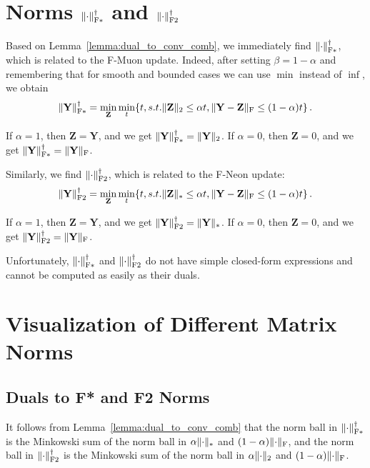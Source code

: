 \documentclass[a4paper,14pt,oneside]{extarticle}
\DeclarePairedDelimiter{\normf}{\|}{\|_\mathrm{F}}
\DeclarePairedDelimiter{\norms}{\|}{\|_{\mathrm{2}}}
\DeclarePairedDelimiter{\normn}{\|}{\|_{*}}
\DeclarePairedDelimiter{\normfstar}{\|}{\|_\mathrm{F*}}
\DeclarePairedDelimiter{\normftwo}{\|}{\|_\mathrm{F2}}
\newcommand{\mY}{\mathbf{Y}}
\newcommand{\mZ}{\mathbf{Z}}
\newcommand{\lemmaref}[1]{Lemma~\ref{#1}}
\begin{document}
\section[Norms for F-Muon and F-Neon]%
        {Norms $\normfstar{\cdot}^\dagger$ and $\normftwo{\cdot}^\dagger$}
\label{sec:f2_fstar_norms}

Based on \lemmaref{lemma:dual_to_conv_comb}, we immediately find $\normfstar{\cdot}^\dagger$, which is related to the F-Muon update. Indeed, after setting $\beta=1-\alpha$ and remembering that for smooth and bounded cases we can use $\min$ instead of $\inf$, we obtain
\begin{equation}\label{eq:normfstardual}
  \normfstar{\mY}^\dagger = \min_{\mZ} \min_t\{t, s.t. \norms{\mZ}\leq \alpha t, \normf{\mY-\mZ}\leq (1-\alpha) t\}\,.
\end{equation}

If $\alpha = 1$, then $\mZ = \mY$, and we get $\normfstar{\mY}^\dagger = \norms{\mY}$. If $\alpha = 0$, then $\mZ = 0$, and we get $\normfstar{\mY}^\dagger = \normf{\mY}$.

Similarly, we find $\normftwo{\cdot}^\dagger$, which is related to the F-Neon update:
\begin{equation}\label{eq:normftwodual}
  \normftwo{\mY}^\dagger = \min_{\mZ} \min_t\{t, s.t. \normn{\mZ}\leq \alpha t, \normf{\mY-\mZ}\leq (1-\alpha) t\}\,.
\end{equation}

If $\alpha = 1$, then $\mZ = \mY$, and we get $\normftwo{\mY}^\dagger = \normn{\mY}$. If $\alpha = 0$, then $\mZ = 0$, and we get $\normftwo{\mY}^\dagger = \normf{\mY}$.

Unfortunately, $\normfstar{\cdot}^\dagger$ and $\normftwo{\cdot}^\dagger$ do not have simple closed-form expressions and cannot be computed as easily as their duals.

\section{Visualization of Different Matrix Norms}
\subsection{Duals to F* and F2 Norms}

It follows from \lemmaref{lemma:dual_to_conv_comb} that the norm ball in $\normfstar{\cdot}^\dagger$ is the Minkowski sum of the norm ball in $\alpha\normn{\cdot}$ and $(1-\alpha)\normf{\cdot}$, and the norm ball in $\normftwo{\cdot}^\dagger$ is the Minkowski sum of the norm ball in $\alpha\norms{\cdot}$ and $(1-\alpha)\normf{\cdot}$.
\end{document}
